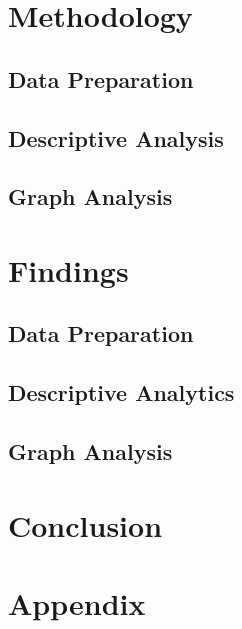 \documentclass[conference]{IEEEtran}
\begin{document}
\section{Methodology}
\label{methods}
\subsection{Data Preparation}
\label{methods-data-preparation}


\subsection{Descriptive Analysis}
\label{methods-descriptive}


\subsection{Graph Analysis}
\label{methods-graph-analysis}


\section{Findings}
\label{findings}
\subsection{Data Preparation}
\label{findings-data-preparation}


\subsection{Descriptive Analytics}
\label{findings-descriptive}


\subsection{Graph Analysis}
\label{findings-graph-analysis}


\section{Conclusion}
\label{conclusion}





\onecolumn
\section{Appendix}
\label{appendix}

\end{document}
